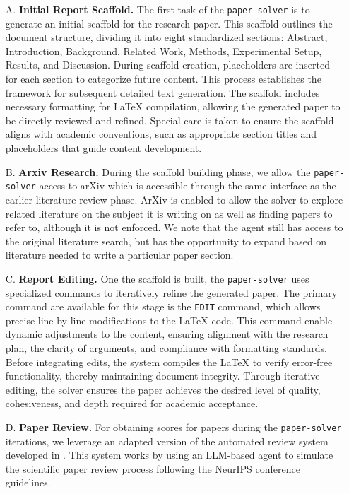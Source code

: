\documentclass[11pt, a4paper]{gdm_format}
\begin{document}
\begin{enumerate}
    \item [A.] \textbf{Initial Report Scaffold.} The first task of the \texttt{paper-solver} is to generate an initial scaffold for the research paper. This scaffold outlines the document structure, dividing it into eight standardized sections: Abstract, Introduction, Background, Related Work, Methods, Experimental Setup, Results, and Discussion. During scaffold creation, placeholders are inserted for each section to categorize future content. This process establishes the framework for subsequent detailed text generation. The scaffold includes necessary formatting for LaTeX compilation, allowing the generated paper to be directly reviewed and refined. Special care is taken to ensure the scaffold aligns with academic conventions, such as appropriate section titles and placeholders that guide content development.
    \item [B.] \textbf{Arxiv Research.} During the scaffold building phase, we allow the \texttt{paper-solver} access to arXiv which is accessible through the same interface as the earlier literature review phase. ArXiv is enabled to allow the solver to explore related literature on the subject it is writing on as well as finding papers to refer to, although it is not enforced. We note that the agent still has access to the original literature search, but has the opportunity to expand based on literature needed to write a particular paper section.
    \item [C.] \textbf{Report Editing.} One the scaffold is built, the \texttt{paper-solver} uses specialized commands to iteratively refine the generated paper. The primary command are available for this stage is the \texttt{EDIT} command, which allows precise line-by-line modifications to the LaTeX code. This command enable dynamic adjustments to the content, ensuring alignment with the research plan, the clarity of arguments, and compliance with formatting standards. Before integrating edits, the system compiles the LaTeX to verify error-free functionality, thereby maintaining document integrity. Through iterative editing, the solver ensures the paper achieves the desired level of quality, cohesiveness, and depth required for academic acceptance. 
    \item [D.] \textbf{Paper Review.} For obtaining scores for papers during the \texttt{paper-solver} iterations, we leverage an adapted version of the automated review system developed in \cite{lu2024aiscientist}. This system works by using an LLM-based agent to simulate the scientific paper review process following the NeurIPS conference guidelines. %

\end{enumerate}
\end{document}
